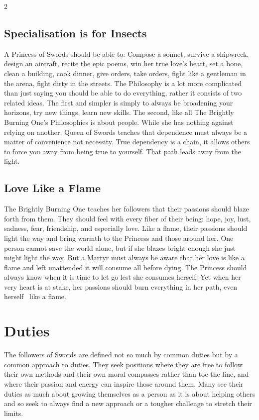 \begin{multicols}{2}
\subsection*{Specialisation is for Insects}

A Princess of Swords should be able to: Compose a sonnet, survive a shipwreck, design an aircraft, recite the epic poems, win her true love's heart, set a bone, clean a building, cook dinner, give orders, take orders, fight like a gentleman in the arena, fight dirty in the streets. The Philosophy is a lot more complicated than just saying you should be able to do everything, rather it consists of two related ideas. The first and simpler is simply to always be broadening your horizons, try new things, learn new skills. The second, like all The Brightly Burning One's Philosophies is about people. While she has nothing against relying on another, Queen of Swords teaches that dependence must always be a matter of convenience not necessity. True dependency is a chain, it allows others to force you away from being true to yourself. That path leads away from the light. 

\subsection*{Love Like a Flame}

The Brightly Burning One teaches her followers that their passions should blaze forth from them. They should feel with every fiber of their being: hope, joy, lust, sadness, fear, friendship, and especially love. Like a flame, their passions should light the way and bring warmth to the Princess and those around her. One person cannot save the world alone, but if she blazes bright enough she just might light the way. But a Martyr must always be aware that her love is like a flame and left unattended it will consume all before dying. The Princess should always know when it is time to let go lest she consumes herself. Yet when her very heart is at stake, her passions should burn everything in her path, even herself \textendash\, like a flame. 

\section*{Duties}

The followers of Swords are defined not so much by common duties but by a common approach to duties. They seek positions where they are free to follow their own methods and their own moral compasses rather than toe the line, and where their passion and energy can inspire those around them. Many see their duties as much about growing themselves as a person as it is about helping others and so seek to always find a new approach or a tougher challenge to stretch their limits.


\end{multicols}
